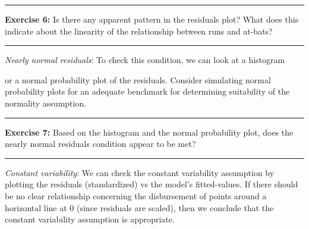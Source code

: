 \documentclass[]{book}
\newenvironment{Shaded}{\begin{snugshade}}{\end{snugshade}}
\newcommand{\CommentTok}[1]{\textcolor[rgb]{0.56,0.35,0.01}{\textit{#1}}}
\newcommand{\KeywordTok}[1]{\textcolor[rgb]{0.13,0.29,0.53}{\textbf{#1}}}
\newcommand{\NormalTok}[1]{#1}
\newcommand{\OperatorTok}[1]{\textcolor[rgb]{0.81,0.36,0.00}{\textbf{#1}}}
\theoremstyle{definition}
\theoremstyle{definition}
\theoremstyle{definition}
\theoremstyle{remark}
\begin{document}
\begin{center}\rule{0.5\linewidth}{\linethickness}\end{center}

\textbf{Exercise 6:} Is there any apparent pattern in the residuals
plot? What does this indicate about the linearity of the relationship
between runs and at-bats?

\begin{center}\rule{0.5\linewidth}{\linethickness}\end{center}

\emph{Nearly normal residuals}: To check this condition, we can look at
a histogram

\begin{Shaded}
\end{Shaded}

or a normal probability plot of the residuals. Consider simulating
normal probability plots for an adequate benchmark for determining
suitability of the normality assumption.

\begin{Shaded}
\end{Shaded}

\begin{center}\rule{0.5\linewidth}{\linethickness}\end{center}

\textbf{Exercise 7:} Based on the histogram and the normal probability
plot, does the nearly normal residuals condition appear to be met?

\begin{center}\rule{0.5\linewidth}{\linethickness}\end{center}

\emph{Constant variability}: We can check the constant variability
assumption by plotting the residuals (standardized) vs the model's
fitted-values. If there should be no clear relationship concerning the
disbursement of points around a horizontal line at 0 (since residuals
are scaled), then we conclude that the constant variability assumption
is appropriate.
\end{document}
